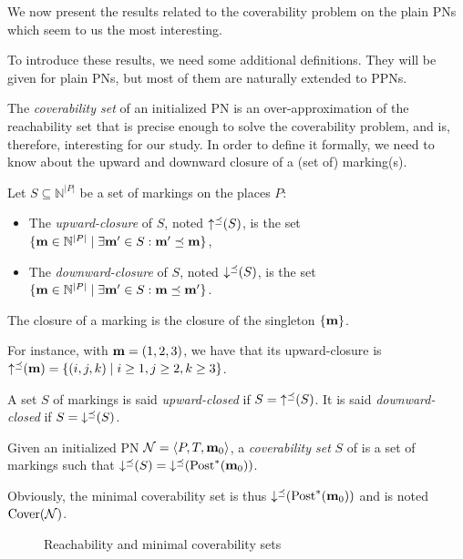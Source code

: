 We now present the results related to the coverability problem on the plain \acp{PN} which seem to us the most interesting.

To introduce these results, we need some additional definitions.
They will be given for plain \acp{PN}, but most of them are naturally extended to \acp{PPN}.

The \emph{coverability set} of an initialized \ac{PN} is an over-approximation of the reachability set that is precise enough to solve the coverability problem, and is, therefore, interesting for our study.
In order to define it formally, we need to know about the upward and downward closure of a (set of) marking(s).

\begin{defi}
  Let $S \subseteq \mathbb{N}^{|P|}$ be a set of markings on the places $P$:
  \begin{itemize}
    \item The \emph{upward-closure} of $S$, noted $\operatorname{\uparrow^\preceq}(S)$, is the set
      $\{\mathbf{m} \in \mathbb{N}^{|P|} \mid \exists \mathbf{m'} \in S : \mathbf{m'} \preceq \mathbf{m}\}$,
    \item The \emph{downward-closure} of $S$, noted $\operatorname{\downarrow^\preceq}(S)$, is the set
      $\{\mathbf{m} \in \mathbb{N}^{|P|} \mid \exists \mathbf{m'} \in S : \mathbf{m} \preceq \mathbf{m'}\}$.
  \end{itemize}
  The closure of a marking \marq is the closure of the singleton $\{\mathbf{m}\}$.
\end{defi}

For instance, with $\mathbf{m} = (1, 2, 3)$, we have that its upward-closure is $\operatorname{\uparrow^\preceq}(\mathbf{m}) = \{(i, j, k) \mid i \geq 1, j \geq 2, k \geq 3\}$.

\begin{defi}
  A set $S$ of markings is said \emph{upward-closed} if $S = \operatorname{\uparrow^\preceq}(S)$.
  It is said \emph{downward-closed} if $S = \operatorname{\downarrow^\preceq}(S)$.
\end{defi}

\begin{defi}
  Given an initialized \ac{PN} $\mathcal{N} = \langle P,T, \mathbf{m}_0\rangle$, a \emph{coverability set} $S$ of \tupleN is a set of markings such that $\operatorname{\downarrow^\preceq}(S) = \operatorname{\downarrow^\preceq}(\operatorname{Post}^*(\mathbf{m}_0))$.
  
  Obviously, the minimal coverability set is thus $\operatorname{\downarrow^\preceq}(\operatorname{Post}^*(\mathbf{m}_0))$ and is noted $\operatorname{Cover}(\mathcal{N})$.
\end{defi}

\begin{figure}[htbp]
  \label{fig:reach-and-cover-example}
  \centering
  \subfloat[A \ac{PN} ($|P| = 2$)]{
    \label{fig:two-net}
    

  }

  \qquad
  \caption{Reachability and minimal coverability sets}
\end{figure}


